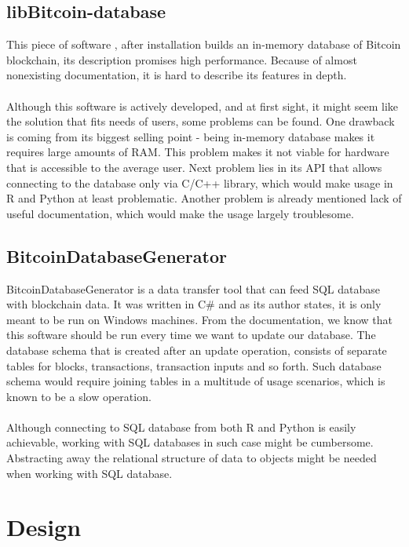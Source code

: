 \documentclass[12pt, en, eng, twoside, final]{mgr}
\begin{document}
\section{libBitcoin-database}

This piece of software \cite{libbitcoin-database}, after installation builds an in-memory database of Bitcoin blockchain, its description promises high performance. Because of almost nonexisting documentation, it is hard to describe its features in depth.
\\
\\
Although this software is actively developed, and at first sight, it might seem like the solution that fits needs of users, some problems can be found. One drawback is coming from its biggest selling point - being in-memory database makes it requires large amounts of RAM. This problem makes it not viable for hardware that is accessible to the average user. Next problem lies in its API that allows connecting to the database only via C/C++ library, which would make usage in R and Python at least problematic. Another problem is already mentioned lack of useful documentation, which would make the usage largely troublesome.

\section{BitcoinDatabaseGenerator}

BitcoinDatabaseGenerator \cite{BitcoinDatabaseGenerator} is a data transfer tool that can feed SQL database with blockchain data. It was written in C\# and as its author states, it is only meant to be run on Windows machines. From the documentation, we know that this software should be run every time we want to update our database. The database schema that is created after an update operation, consists of separate tables for blocks, transactions, transaction inputs and so forth. Such database schema would require joining tables in a multitude of usage scenarios, which is known to be a slow operation.
\\
\\
Although connecting to SQL database from both R and Python is easily achievable, working with SQL databases in such case might be cumbersome. Abstracting away the relational structure of data to objects might be needed when working with SQL database. 


\chapter{Design}
\end{document}
